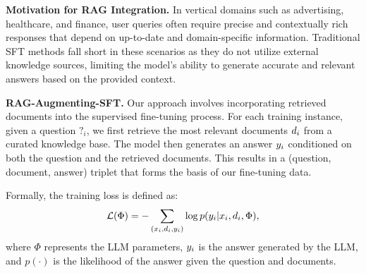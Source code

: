 \textbf{Motivation for RAG Integration.} In vertical domains such as advertising, healthcare, and finance, user queries often require precise and contextually rich responses that depend on up-to-date and domain-specific information. Traditional SFT methods fall short in these scenarios as they do not utilize external knowledge sources, limiting the model's ability to generate accurate and relevant answers based on the provided context.

\textbf{RAG-Augmenting-SFT.} Our approach involves incorporating retrieved documents into the supervised fine-tuning process. For each training instance, given a question $\question_i$, we first retrieve the most relevant documents $d_i$ from a curated knowledge base. The model then generates an answer $y_i$ conditioned on both the question and the retrieved documents. This results in a (question, document, answer) triplet that forms the basis of our fine-tuning data.

Formally, the training loss is defined as: \begin{equation} \mathcal{L}(\Phi) = -\sum_{(x_i,d_i,y_i)}\log p(y_i|x_i,d_i,\Phi), \end{equation} where $\Phi$ represents the LLM parameters, $y_i$ is the answer generated by the LLM, and $p(\cdot)$ is the likelihood of the answer given the question and documents.

